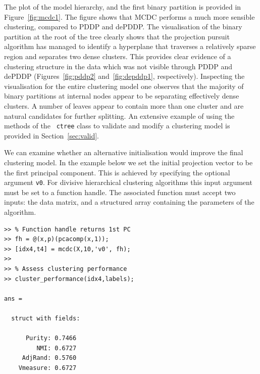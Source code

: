 \documentclass{book}
\begin{document}
The plot of the model hierarchy, and the first binary partition is provided in
Figure~\ref{fig:mcdc1}.
%
The figure shows that MCDC performs a much more sensible clustering, compared
to PDDP and dePDDP. The visualisation of the binary partition at the root of
the tree clearly shows that the projection pursuit algorithm has managed to
identify a hyperplane that traverses a relatively sparse region and separates two
dense clusters. This provides clear evidence of a clustering structure in the
data which was not visible through PDDP and dePDDP (Figures~\ref{fig:pddp2}
and~\ref{fig:depddp1}, respectively).
%
Inspecting the visualisation for the entire clustering model one observes that
the majority of binary partitions at internal nodes appear to be separating
effectively dense clusters. 
%
%
A number of leaves appear to contain more than one cluster and are natural
candidates for further splitting. 
%
An extensive example of using the methods of the {\tt
ctree} class to validate and modify a clustering model is
provided in Section~\ref{sec:valid}.



We can examine whether an alternative initialisation would improve the final
clustering model. In the example below we set the initial projection vector to
be the first principal component. This is achieved by specifying the optional argument
{\tt v0}. For divisive hierarchical clustering algorithms this input argument
must be set to a function handle.
The associated function must accept two inputs:
the data matrix, and a structured array containing the parameters of the algorithm.
%

\begin{verbatim}
>> % Function handle returns 1st PC
>> fh = @(x,p)(pcacomp(x,1));
>> [idx4,t4] = mcdc(X,10,'v0', fh);
>> 
>> % Assess clustering performance
>> cluster_performance(idx4,labels);

ans = 

  struct with fields:

      Purity: 0.7466
         NMI: 0.6727
     AdjRand: 0.5760
    Vmeasure: 0.6727

\end{verbatim}
\end{document}
